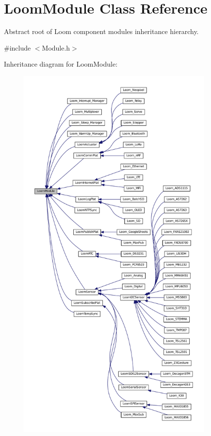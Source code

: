 \hypertarget{class_loom_module}{}\section{Loom\+Module Class Reference}
\label{class_loom_module}


Abstract root of Loom component modules inheritance hierarchy.  




{\ttfamily \#include $<$Module.\+h$>$}



Inheritance diagram for Loom\+Module\+:\nopagebreak
\begin{figure}[H]
\begin{center}
\leavevmode
\includegraphics[height=550pt]{class_loom_module__inherit__graph}
\end{center}
\end{figure}

